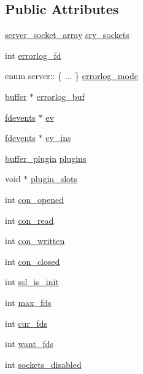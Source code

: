 \subsection*{Public Attributes}
\begin{DoxyCompactItemize}
\item 
\hyperlink{structserver__socket__array}{server\-\_\-socket\-\_\-array} \hyperlink{structserver_ab1a5109e0d0f8a13596bbb2e322e5dea}{srv\-\_\-sockets}
\item 
int \hyperlink{structserver_a2344112517b6ad3b3effba4d90b066f2}{errorlog\-\_\-fd}
\item 
enum server\-:: \{ ... \}  \hyperlink{structserver_aa46064efff0a347249d0769903a6d1f7}{errorlog\-\_\-mode}
\item 
\hyperlink{structbuffer}{buffer} $\ast$ \hyperlink{structserver_aaf9cb0474f87c1537eea6bb64babe84a}{errorlog\-\_\-buf}
\item 
\hyperlink{structfdevents}{fdevents} $\ast$ \hyperlink{structserver_a3f826cecce3b94fffab041f62192b7f8}{ev}
\item 
\hyperlink{structfdevents}{fdevents} $\ast$ \hyperlink{structserver_a57305fbd44d06ebb5eede8e6b64bdc5f}{ev\-\_\-ins}
\item 
\hyperlink{structbuffer__plugin}{buffer\-\_\-plugin} \hyperlink{structserver_af22577eb49dc399ae96da71a574b131e}{plugins}
\item 
void $\ast$ \hyperlink{structserver_aa2f45423f3ebe71282610e237ce2ae9a}{plugin\-\_\-slots}
\item 
int \hyperlink{structserver_a443bc75596c08290e8418a8666630260}{con\-\_\-opened}
\item 
int \hyperlink{structserver_ace5fa64dcce8c9732dc7b6a9015977e7}{con\-\_\-read}
\item 
int \hyperlink{structserver_ad04bd631448024d1763ff54c2b620723}{con\-\_\-written}
\item 
int \hyperlink{structserver_aee61b289e4e095db5620202e75b2ca90}{con\-\_\-closed}
\item 
int \hyperlink{structserver_a40cff5804e1175f2c61a5f40ed169ca1}{ssl\-\_\-is\-\_\-init}
\item 
int \hyperlink{structserver_a1240887eef32a47b45b92d75c7db35c4}{max\-\_\-fds}
\item 
int \hyperlink{structserver_ae57e4289212df48f77aa63a2f5bc3a8e}{cur\-\_\-fds}
\item 
int \hyperlink{structserver_a5f3524c33bbea0b20ddbd4492027bce9}{want\-\_\-fds}
\item 
int \hyperlink{structserver_accf5f45a3d146f55f2ac2acc5a495f27}{sockets\-\_\-disabled}

\end{DoxyCompactItemize}
